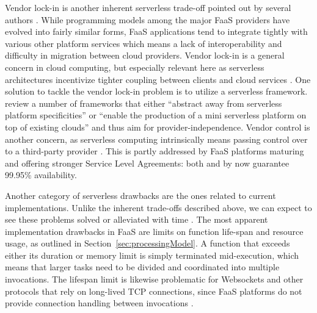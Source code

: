 Vendor lock-in is another inherent serverless trade-off pointed out by several authors \parencite[including][]{baldini17currentTrends,cncf18serverlessWG,robert2016serverlessarchitectures}. While programming models among the major FaaS providers have evolved into fairly similar forms, FaaS applications tend to integrate tightly with various other platform services which means a lack of interoperability and difficulty in migration between cloud providers. Vendor lock-in is a general concern in cloud computing, but especially relevant here as serverless architectures incentivize tighter coupling between clients and cloud services \parencite{adzic2017serverless}. One solution to tackle the vendor lock-in problem is to utilize a serverless framework. \textcite{kritikos18frameworks} review a number of frameworks that either ``abstract away from serverless platform specificities'' or ``enable the production of a mini serverless platform on top of existing clouds'' and thus aim for provider-independence. Vendor control is another concern, as serverless computing intrinsically means passing control over to a third-party provider \parencite{robert2016serverlessarchitectures}. This is partly addressed by FaaS platforms maturing and offering stronger Service Level Agreements: both \textcite{awslambda0218} and \textcite{microsoft18azureFunctions} by now guarantee 99.95\% availability.

Another category of serverless drawbacks are the ones related to current implementations. Unlike the inherent trade-offs described above, we can expect to see these problems solved or alleviated with time \parencite{robert2016serverlessarchitectures}. The most apparent implementation drawbacks in FaaS are limits on function life-span and resource usage, as outlined in Section~\ref{sec:processingModel}. A function that exceeds either its duration or memory limit is simply terminated mid-execution, which means that larger tasks need to be divided and coordinated into multiple invocations. The lifespan limit is likewise problematic for Websockets and other protocols that rely on long-lived TCP connections, since FaaS platforms do not provide connection handling between invocations \parencite{hendrickson16openlambda}.

